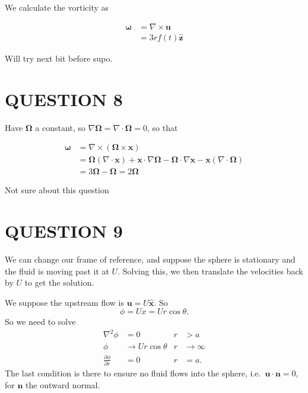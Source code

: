 \documentclass[a4paper]{article}
\begin{document}
We calculate the vorticity as 

\begin{align*}
\mathbf{\omega} & = \nabla  \times \mathbf{u} \\
& = 3r f(t) \hat{\mathbf{z}}
\end{align*}

Will try next bit before supo.

\section{QUESTION 8}

Have $ \mathbf{\Omega} $ a constant, so $ \nabla \mathbf{\Omega} = \nabla  \cdot \mathbf{\Omega} = 0 $, so that 

\begin{align*}
\mathbf{\omega} & = \nabla \times (\mathbf{\Omega}  \times \mathbf{x} ) \\
& = \mathbf{\Omega}(\nabla  \cdot \mathbf{x}) + \mathbf{x} \cdot \nabla \mathbf{\Omega} - \mathbf{\Omega} \cdot \nabla \mathbf{x}   - \mathbf{x}(\nabla  \cdot \mathbf{\Omega})   \\
& = 3 \mathbf{\Omega} - \mathbf{\Omega} = 2 \mathbf{\Omega}
\end{align*}

Not sure about this question


\section{QUESTION 9}

We can change our frame of reference, and suppose the sphere is stationary and the fluid is moving past it at $U$. Solving this, we then translate the velocities back by $U$ to get the solution.

\begin{center}
\end{center}
We suppose the upstream flow is $\mathbf{u} = U \hat{\mathbf{x}}$. So
\[
\phi = Ux = Ur\cos \theta.
\]
So we need to solve
\begin{align*}
\nabla^2 \phi &= 0 & r &>a\\
\phi&\to Ur \cos \theta & r &\to \infty\\
\frac{\partial \phi}{\partial r}&= 0 & r&=a.
\end{align*}
The last condition is there to ensure no fluid flows into the sphere, i.e.\ $\mathbf{u}\cdot \mathbf{n} = 0$, for $\mathbf{n}$ the outward normal.
\end{document}
